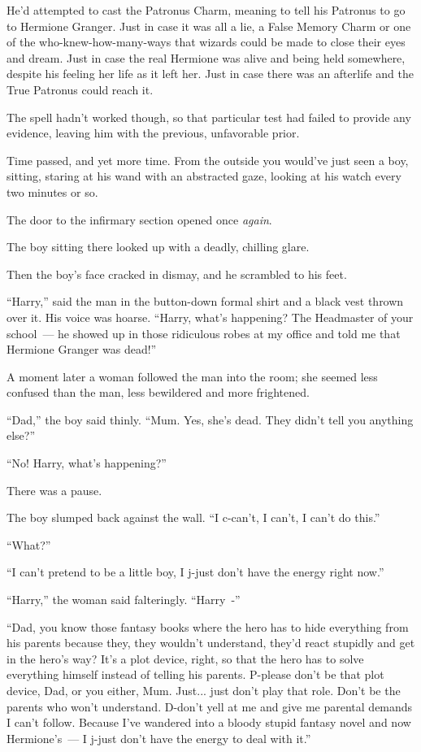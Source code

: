 He'd attempted to cast the Patronus Charm, meaning to tell his Patronus to go to Hermione Granger. Just in case it was all a lie, a False Memory Charm or one of the who-knew-how-many-ways that wizards could be made to close their eyes and dream. Just in case the real Hermione was alive and being held somewhere, despite his feeling her life as it left her. Just in case there was an afterlife and the True Patronus could reach it.

The spell hadn't worked though, so that particular test had failed to provide any evidence, leaving him with the previous, unfavorable prior.

Time passed, and yet more time. From the outside you would've just seen a boy, sitting, staring at his wand with an abstracted gaze, looking at his watch every two minutes or so.

The door to the infirmary section opened once \emph{again}.

The boy sitting there looked up with a deadly, chilling glare.

Then the boy's face cracked in dismay, and he scrambled to his feet.

``Harry,'' said the man in the button-down formal shirt and a black vest thrown over it. His voice was hoarse. ``Harry, what's happening? The Headmaster of your school~--- he showed up in those ridiculous robes at my office and told me that Hermione Granger was dead!''

A moment later a woman followed the man into the room; she seemed less confused than the man, less bewildered and more frightened.

``Dad,'' the boy said thinly. ``Mum. Yes, she's dead. They didn't tell you anything else?''

``No! Harry, what's happening?''

There was a pause.

The boy slumped back against the wall. ``I c-can't, I can't, I can't do this.''

``What?''

``I can't pretend to be a little boy, I j-just don't have the energy right now.''

``Harry,'' the woman said falteringly. ``Harry~-''

``Dad, you know those fantasy books where the hero has to hide everything from his parents because they, they wouldn't understand, they'd react stupidly and get in the hero's way? It's a plot device, right, so that the hero has to solve everything himself instead of telling his parents. P-please don't be that plot device, Dad, or you either, Mum. Just... just don't play that role. Don't be the parents who won't understand. D-don't yell at me and give me parental demands I can't follow. Because I've wandered into a bloody stupid fantasy novel and now Hermione's~--- I j-just don't have the energy to deal with it.''

